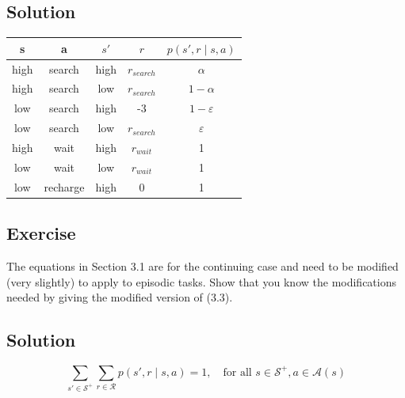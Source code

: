 \documentclass[11pt]{article}
\begin{document}
	\subsection*{Solution}
	\begin{tabular}{|c|c|c|c|c|}
		\hline
		s & a & $s'$  & $r$ & $p(s', r\mid s,a)$ \\
		\hline
		high & search & high & $r_{search}$ & $\alpha$  \\
		high & search & low & $r_{search}$ & $1-\alpha$ \\
		low & search & high  & -3& $1-\varepsilon$ \\
		low & search & low  & $r_{search}$& $\varepsilon$ \\
		high & wait & high & $r_{wait}$& 1  \\
	
	
		low & wait & low & $r_{wait}$ & 1  \\
		low & recharge & high & 0 & 1  \\
	
		\hline
	\end{tabular}
	
	\subsection{}
	\subsection*{Exercise}
	The equations in Section 3.1 are for the continuing case and need to be
	modified (very slightly) to apply to episodic tasks. Show that you know the modifications
	needed by giving the modified version of (3.3).
	\subsection*{Solution}
	$$\sum_{s'\in\mathcal S^+}\sum_{r\in\mathcal R}p(s',r\mid s, a)=1,\quad \text{for all }s\in\mathcal S^+,a\in\mathcal A(s)$$
	
\end{document}

